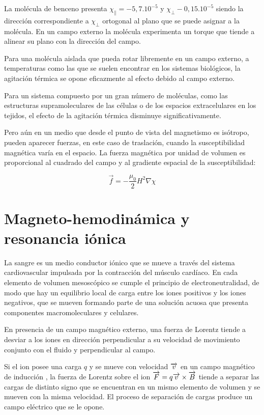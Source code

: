 La molécula de benceno presenta $\chi_{\parallel}=−5,7.10^{−5}$ y $\chi_{\perp}−0,15.10^{−5}$ siendo la dirección correspondiente a $\chi_{\perp}$ ortogonal al plano que se puede asignar a la molécula. En un campo externo la molécula experimenta un torque que tiende a alinear su plano con la dirección del campo.

Para una molécula aislada que pueda rotar libremente en un campo externo, a temperaturas como las que se suelen encontrar en los sistemas biológicos, la agitación térmica se opone eficazmente al efecto debido al campo externo.

Para un sistema compuesto por un gran número de moléculas, como las estructuras supramoleculares de las células o de los espacios extracelulares en los tejidos, el efecto de la agitación térmica disminuye significativamente.

Pero aún en un medio que desde el punto de vista del magnetismo es isótropo, pueden aparecer fuerzas, en este caso de traslación, cuando la susceptibilidad magnética varía en el espacio.
La fuerza magnética por unidad de volumen es proporcional al cuadrado del campo y al gradiente espacial de la susceptibilidad:

\begin{equation}
	\label{eq:619}
	\overrightarrow{f}=-\dfrac{\mu_{0}}{2}H^{2}\nabla \chi	
\end{equation}

\section{Magneto-hemodinámica y resonancia iónica}

La sangre es un medio conductor iónico que se mueve a través del sistema cardiovascular impulsada por la contracción del músculo cardíaco. En cada elemento de volumen mesoscópico se cumple el principio de electroneutralidad, de modo que hay un equilibrio local de carga entre los iones positivos y los iones negativos, que se mueven formando parte de una solución acuosa que presenta componentes macromoleculares y celulares.

En presencia de un campo magnético externo, una fuerza de Lorentz tiende a desviar a los iones en dirección perpendicular a su velocidad de movimiento conjunto con el fluido y perpendicular al campo.

Si el ion posee una carga $q$ y se mueve con velocidad $\overrightarrow{v}$ en un campo magnético de inducción , la fuerza de Lorentz sobre el ion $\overrightarrow{F}=q\overrightarrow{v}\times\overrightarrow{B}$ tiende a separar las cargas de distinto signo que se encuentran en un mismo elemento de volumen y se mueven con la misma velocidad. El proceso de separación de cargas produce un campo eléctrico que se le opone.

